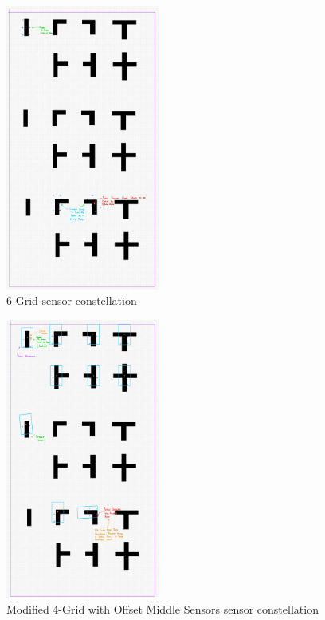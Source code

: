 \documentclass[conference]{IEEEtran}
\begin{document}
\begin{figure}[htbp]
	\centerline{\includegraphics[width=0.45\textwidth]{constellation-6-grid.png}}
	\caption{6-Grid sensor constellation}
	\label{fig:constellation-6-grid}
\end{figure}
\begin{figure}[htbp]
	\centerline{\includegraphics[width=0.45\textwidth]{constellation-4-offset.png}}
	\caption{Modified 4-Grid with Offset Middle Sensors sensor constellation}
	\label{fig:constellation-4-offset}
\end{figure}
\end{document}
